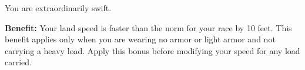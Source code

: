 
You are extraordinarily swift.

\textbf{Benefit:} Your land speed is faster than the norm for your race by 10 feet. This benefit applies only when you are wearing no armor or light armor and not carrying a heavy load. Apply this bonus before modifying your speed for any load carried.